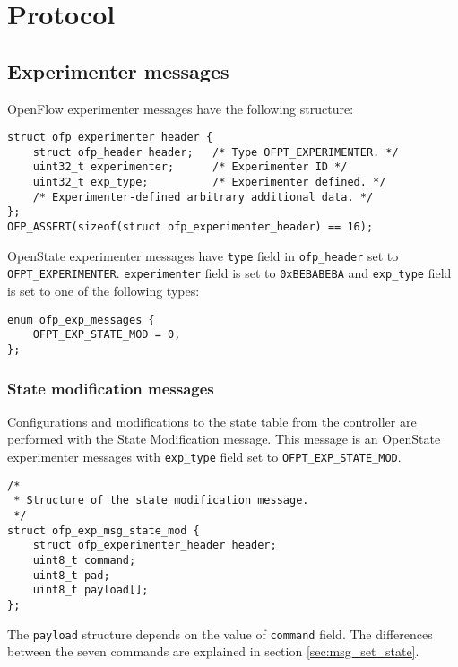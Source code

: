
\chapter{Protocol}
\label{chap:protocol}

\section{Experimenter messages}
OpenFlow experimenter messages have the following structure:

\scriptsize\begin{verbatim}
struct ofp_experimenter_header {
    struct ofp_header header;   /* Type OFPT_EXPERIMENTER. */
    uint32_t experimenter;      /* Experimenter ID */
    uint32_t exp_type;          /* Experimenter defined. */
    /* Experimenter-defined arbitrary additional data. */
};
OFP_ASSERT(sizeof(struct ofp_experimenter_header) == 16);
\end{verbatim}\normalsize

OpenState experimenter messages have \texttt{type} field in \texttt{ofp\_header} set to \texttt{OFPT\_EXPERIMENTER}. \texttt{experimenter} field is set to \texttt{0xBEBABEBA} and \texttt{exp\_type} field is set to one of the following types:

\scriptsize\begin{verbatim}
enum ofp_exp_messages {
    OFPT_EXP_STATE_MOD = 0,
};
\end{verbatim}\normalsize

\subsection{State modification messages}

\label{sec:msg_set_state_proto}

Configurations and modifications to the state table from the controller are performed with the State Modification message.
This message is an OpenState experimenter messages with \texttt{exp\_type} field set to \texttt{OFPT\_EXP\_STATE\_MOD}.

\scriptsize\begin{verbatim}
/*
 * Structure of the state modification message.
 */
struct ofp_exp_msg_state_mod {
    struct ofp_experimenter_header header;
    uint8_t command;
    uint8_t pad;
    uint8_t payload[];
};
\end{verbatim}\normalsize
The \texttt{payload} structure depends on the value of \texttt{command} field. The differences between the seven commands are explained in section \ref{sec:msg_set_state}.

